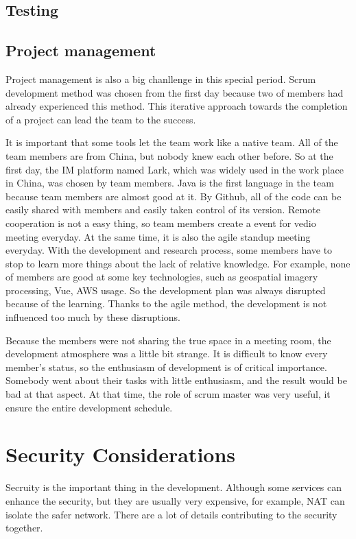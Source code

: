 \documentclass[conference]{IEEEtran}
\begin{document}
\subsection{Testing}

\subsection{Project management}

Project management is also a big chanllenge in this special period. Scrum development method was chosen from the first day because two of members
had already experienced this method. This iterative approach towards the completion of a project can lead the team to the success.

It is important that some tools let the team work like a native team. All of the team members are from China, but nobody knew each other before. 
So at the first day, the IM platform named Lark, which was widely used in the work place in China, was chosen by team members. Java is the first 
language in the team because team members are almost good at it. By Github, all of the code can be easily shared with members and easily taken 
control of its version. Remote cooperation is not a easy thing, so team members create a event for vedio meeting everyday. At the same time, it 
is also the agile standup meeting everyday. With the development and research process, some members have to stop to learn more things about the 
lack of relative knowledge. For example, none of members are good at some key technologies, such as geospatial imagery processing, Vue, AWS usage. 
So the development plan was always disrupted because of the learning. Thanks to the agile method, the development is not influenced too much by 
these disruptions. 

Because the members were not sharing the true space in a meeting room, the development atmosphere was a little bit strange. It is difficult to know 
every member's status, so the enthusiasm of development is of critical importance. Somebody went about their tasks with little enthusiasm, and the 
result would be bad at that aspect. At that time, the role of scrum master was very useful, it ensure the entire development schedule.

\section{Security Considerations}

Secruity is the important thing in the development. Although some services can enhance the security, but they are usually very expensive, for example, 
NAT can isolate the safer network. There are a lot of details contributing to the security together.
\end{document}
